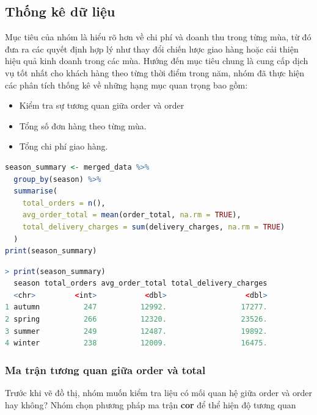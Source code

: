 \subsection{Thống kê dữ liệu}
Mục tiêu của nhóm là hiểu rõ hơn về chi phí và doanh thu trong từng mùa, từ đó đưa ra các quyết định hợp lý như thay đổi chiến lược giao hàng hoặc cải thiện hiệu quả kinh doanh trong các mùa. Hướng đến mục tiêu chung là cung cấp dịch vụ tốt nhất cho khách hàng theo từng thời điểm trong năm, nhóm đã thực hiện các phân tích thống kê về những hạng mục quan trọng bao gồm:

\begin{itemize}
    \item Kiểm tra sự tương quan giữa order và order 
    \item Tổng số đơn hàng theo từng mùa.
    \item Tổng chi phí giao hàng.
    
\end{itemize}

\begin{lstlisting}[language=R, caption=Thống kê]
season_summary <- merged_data %>%
  group_by(season) %>%
  summarise(
    total_orders = n(),
    avg_order_total = mean(order_total, na.rm = TRUE),
    total_delivery_charges = sum(delivery_charges, na.rm = TRUE)
  )
print(season_summary)

\end{lstlisting}
\begin{lstlisting}[language=R, caption=Thông số từng hạng mục theo mùa]
> print(season_summary)
  season total_orders avg_order_total total_delivery_charges
  <chr>         <int>           <dbl>                  <dbl>
1 autumn          247          12992.                 17277.
2 spring          266          12320.                 23526.
3 summer          249          12487.                 19892.
4 winter          238          12009.                 16475.
\end{lstlisting}
\subsubsection{Ma trận tương quan giữa order và total}
Trước khi vẽ đồ thị, nhóm muốn kiểm tra liệu có mối quan hệ giữa order và order hay không? Nhóm chọn phương pháp ma trận \textbf{cor} để thể hiện độ tương quan

